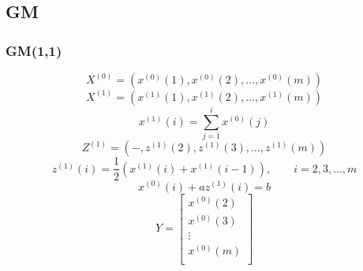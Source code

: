 
\subsection{GM}

\subsubsection{GM(1,1)}

\begin{displaymath}
X^{(0)}=(x^{(0)}(1),x^{(0)}(2),\ldots,x^{(0)}(m))
\end{displaymath}
\begin{displaymath}
X^{(1)}=(x^{(1)}(1),x^{(1)}(2),\ldots,x^{(1)}(m))
\end{displaymath}
\begin{displaymath}
x^{(1)}(i)=\sum_{j=1}^{i}{x^{(0)}(j)}
\end{displaymath}
\begin{displaymath}
Z^{(1)}=(-,z^{(1)}(2),z^{(1)}(3),\ldots,z^{(1)}(m))
\end{displaymath}
\begin{displaymath}
z^{(1)}(i)=\frac{1}{2}(x^{(1)}(i)+x^{(1)}(i-1)),\qquad i=2,3,\ldots,m
\end{displaymath}
\begin{displaymath}
x^{(0)}(i)+az^{(1)}(i)=b
\end{displaymath}
\begin{displaymath}
Y=\left[
\begin{matrix}
x^{(0)}(2)\\
x^{(0)}(3)\\
\vdots\\
x^{(0)}(m)\\
\end{matrix}
\right]
\end{displaymath}


